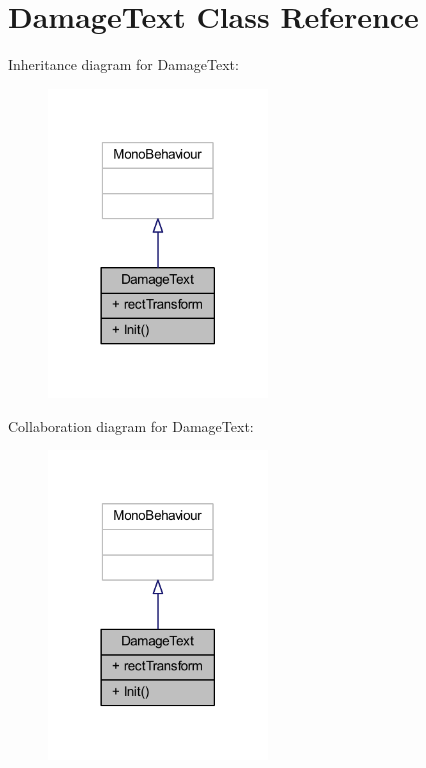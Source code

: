 \hypertarget{class_damage_text}{}\section{Damage\+Text Class Reference}
\label{class_damage_text}


Inheritance diagram for Damage\+Text\+:
\nopagebreak
\begin{figure}[H]
\begin{center}
\leavevmode
\includegraphics[width=165pt]{class_damage_text__inherit__graph}
\end{center}
\end{figure}


Collaboration diagram for Damage\+Text\+:
\nopagebreak
\begin{figure}[H]
\begin{center}
\leavevmode
\includegraphics[width=165pt]{class_damage_text__coll__graph}
\end{center}
\end{figure}
